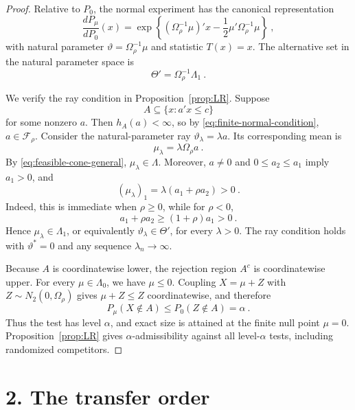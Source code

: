 \documentclass[12pt]{article}
\theoremstyle{remark}
\begin{document}
\begin{proof}
Relative to $P_0$, the normal experiment has the canonical representation
\[
\frac{dP_\mu}{dP_0}(x)
=\exp\left\{(\Omega_\rho^{-1}\mu)'x
-\frac12\mu'\Omega_\rho^{-1}\mu\right\}~,
\]
with natural parameter $\vartheta=\Omega_\rho^{-1}\mu$ and statistic
$T(x)=x$.  The alternative set in the natural parameter space is
\[
\Theta'=\Omega_\rho^{-1}\Lambda_1~.
\]

We verify the ray condition in Proposition~\ref{prop:LR}.  Suppose
\[
A\subseteq\{x:a'x\le c\}
\]
for some nonzero $a$.  Then $h_A(a)<\infty$, so by
\eqref{eq:finite-normal-condition}, $a\in\mathcal F_\rho$.  Consider the
natural-parameter ray $\vartheta_\lambda=\lambda a$.  Its corresponding mean is
\[
\mu_\lambda=\lambda\Omega_\rho a~.
\]
By \eqref{eq:feasible-cone-general}, $\mu_\lambda\in\Lambda$.  Moreover,
$a\ne0$ and $0\le a_2\le a_1$ imply $a_1>0$, and
\[
(\mu_\lambda)_1
=\lambda(a_1+\rho a_2)>0~.
\]
Indeed, this is immediate when $\rho\ge0$, while for $\rho<0$,
\[
a_1+\rho a_2\ge (1+\rho)a_1>0~.
\]
Hence $\mu_\lambda\in\Lambda_1$, or equivalently
$\vartheta_\lambda\in\Theta'$, for every $\lambda>0$.  The ray condition holds
with $\vartheta^*=0$ and any sequence $\lambda_n\to\infty$.

Because $A$ is coordinatewise lower, the rejection region $A^c$ is
coordinatewise upper.  For every $\mu\in\Lambda_0$, we have $\mu\le0$.
Coupling $X=\mu+Z$ with $Z\sim N_2(0,\Omega_\rho)$ gives
$\mu+Z\le Z$ coordinatewise, and therefore
\[
P_\mu(X\notin A)\le P_0(Z\notin A)=\alpha~.
\]
Thus the test has level $\alpha$, and exact size is attained at the finite null
point $\mu=0$.  Proposition~\ref{prop:LR} gives $\alpha$-admissibility against
all level-$\alpha$ tests, including randomized competitors.
\end{proof}

\section*{2. The transfer order}
\end{document}
